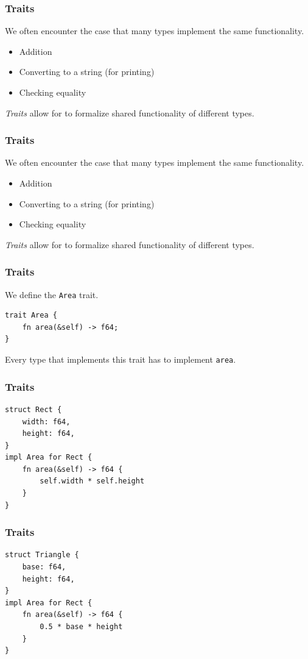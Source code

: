 \begin{frame}[fragile]
    \frametitle{Traits}
    We often encounter the case that many types implement the same functionality.
    \begin{itemize}
        \item Addition
        \item Converting to a string (for printing)
        \item Checking equality
    \end{itemize}
    \pause
    \vfill
    \textit{Traits} allow for to formalize shared functionality of different types.
\end{frame}

\begin{frame}[fragile]
    \frametitle{Traits}
    We often encounter the case that many types implement the same functionality.
    \begin{itemize}
        \item Addition
        \item Converting to a string (for printing)
        \item Checking equality
    \end{itemize}
    \pause
    \vfill
    \textit{Traits} allow for to formalize shared functionality of different types.
\end{frame}

\begin{frame}[fragile]
    \frametitle{Traits}
    We define the \texttt{Area} trait.
    \vfill
    \begin{verbatim}
trait Area {
    fn area(&self) -> f64;
}
    \end{verbatim}
    \pause
    \vfill
    Every type that implements this trait has to implement \texttt{area}.
\end{frame}

\begin{frame}[fragile]
    \frametitle{Traits}
    \begin{verbatim}
struct Rect {
    width: f64,
    height: f64,
}
impl Area for Rect {
    fn area(&self) -> f64 {
        self.width * self.height
    }
}
    \end{verbatim}
\end{frame}

\begin{frame}[fragile]
    \frametitle{Traits}
    \begin{verbatim}
struct Triangle {
    base: f64,
    height: f64,
}
impl Area for Rect {
    fn area(&self) -> f64 {
        0.5 * base * height
    }
}
    \end{verbatim}
\end{frame}

